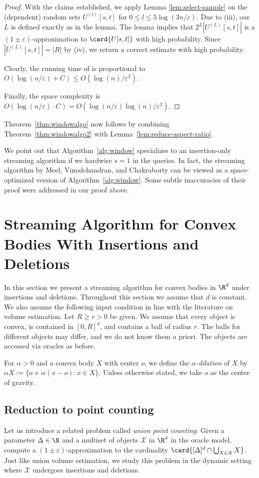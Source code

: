 \documentclass[a4paper, 11pt]{article}
\newcommand{\eps}{\varepsilon}
\newcommand{\class}[1]{\mathcal{#1}}
\begin{document}
\begin{proof}
    With the claims established, we apply Lemma \ref{lem:select-sample} on the (dependent) random sets $U^{(l)}[s,t]$ for $0 \le l \le 5 \log(3n/\eps)$. Due to (iii), our $L$ is defined exactly as in the lemma. The lemma implies that $2^L |U^{(L)}[s,t]|$ is a $(1 \pm \eps)$-approximation to $\card{U[s,t]}$ with high probability. Since $|U^{(L)}[s,t]| = |R|$ by (iv), we return a correct estimate with high probability.

    Clearly, the running time of \est is proportional to $O(\log(n/\eps) + C) \leq O(\log(n)/\eps^2)$.

    Finally, the space complexity is $O(\log(n/\eps) \cdot C) = O(\log(n/\eps) \log(n)/\eps^2 )$.
\end{proof}

Theorem~\ref{thm:windowalgo} now follows by combining Theorem~\ref{thm:windowalgo2} with Lemma~\ref{lem:reduce-aspect-ratio}.

We point out that Algorithm~\ref{alg:window} specializes to an insertion-only streaming algorithm if we hardwire $s = 1$ in the queries. In fact, the streaming algorithm by Meel, Vinodchandran, and Chakraborty \cite{MVC21} can be viewed as a space-optimized version of Algorithm~\ref{alg:window}. Some subtle inaccuracies of their proof were addressed in our proof above.


\section{Streaming Algorithm for Convex Bodies With Insertions and Deletions}
\label{sec:convex}
In this section we present a streaming algorithm for convex bodies in $\R^d$ under insertions and deletions. Throughout this section we assume that $d$ is constant. We also assume the following input condition in line with the literature on volume estimation. Let $R \geq r > 0$ be given. We assume that every object is convex, is contained in $[0,R]^d$, and contains a ball of radius $r$. The balls for different objects may differ, and we do not know them a priori. The objects are accessed via oracles as before.

For $\alpha > 0$ and a convex body $X$ with center $o$, we define the \emph{$\alpha$-dilation} of $X$ by $\alpha X := \{ o + \alpha (x-o) : x \in X \}$. Unless otherwise stated, we take $o$ as the center of gravity.

\subsection{Reduction to point counting}
Let us introduce a related problem called \emph{union point counting}: Given a parameter $\Delta \in \N$ and a multiset of objects $\class{X}$ in $\R^d$ in the oracle model, compute a $(1 \pm \eps)$-approximation to the cardinality $\card{[\Delta]^d \cap \bigcup_{X \in \class{X}} X}$. Just like union volume estimation, we study this problem in the dynamic setting where $\class{X}$ undergoes insertions and deletions.
\end{document}
